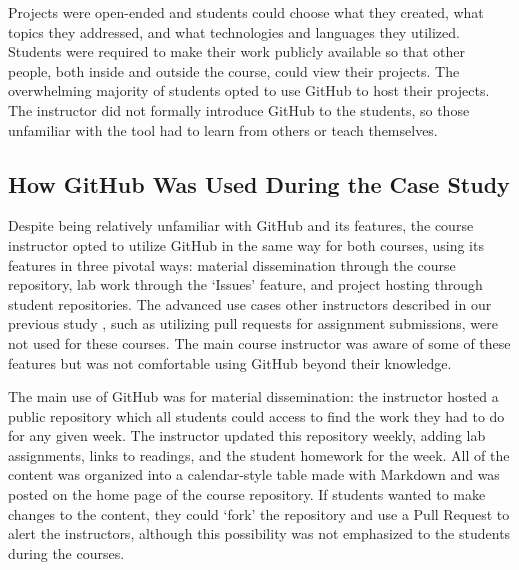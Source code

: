 Projects were open-ended and students could choose what they created, what topics they addressed, and what technologies and languages they utilized. Students were required to make their work publicly available so that other people, both inside and outside the course, could view their projects. The overwhelming majority of students opted to use GitHub to host their projects. The instructor did not formally introduce GitHub to the students, so those unfamiliar with the tool had to learn from others or teach themselves.

\subsection{How GitHub Was Used During the Case Study}
Despite being relatively unfamiliar with GitHub and its features, the course instructor opted to utilize GitHub in the same way for both courses, using its features in three pivotal ways: material dissemination through the course repository, lab work through the `Issues' feature, and project hosting through student repositories. The advanced use cases other instructors described in our previous study \cite{zagalsky2015emergence}, such as utilizing pull requests for assignment submissions, were not used for these courses. The main course instructor was aware of some of these features but was not comfortable using GitHub beyond their knowledge.

The main use of GitHub was for material dissemination: the instructor hosted a public repository which all students could access to find the work they had to do for any given week. The instructor updated this repository weekly, adding lab assignments, links to readings, and the student homework for the week. All of the content was organized into a calendar-style table made with Markdown and was posted on the home page of the course repository. If students wanted to make changes to the content, they could `fork' the repository and use a Pull Request to alert the instructors, although this possibility was not emphasized to the students during the courses.

